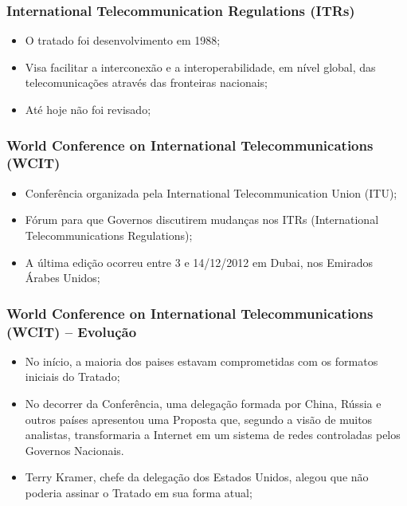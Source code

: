 \documentclass{beamer}
\begin{document}

\begin{frame}
\frametitle{International Telecommunication Regulations (ITRs)}
\begin{itemize}
\item O tratado foi desenvolvimento em 1988;
\item Visa facilitar a interconexão e a interoperabilidade, em nível global, das telecomunicações através das fronteiras nacionais;
\item Até hoje não foi revisado;
\end{itemize}
\end{frame}


\begin{frame}
\frametitle{World Conference on International Telecommunications (WCIT)}
\begin{itemize}
\item Conferência organizada pela International Telecommunication Union (ITU);
\item Fórum para que Governos discutirem mudanças nos ITRs (International Telecommunications Regulations); 
\item A última edição ocorreu entre 3 e 14/12/2012 em Dubai, nos Emirados Árabes Unidos;
\end{itemize}
\end{frame}


\begin{frame}
\frametitle{World Conference on International Telecommunications (WCIT) -- Evolução}
\begin{itemize}
\item No início, a maioria dos paises estavam comprometidas com os formatos iniciais do Tratado;
\item No decorrer da Conferência, uma delegação formada por China, Rússia e outros países apresentou uma Proposta que, segundo a visão de muitos analistas, transformaria a Internet em um sistema de redes controladas pelos Governos Nacionais.
\item Terry Kramer, chefe da delegação dos Estados Unidos, alegou que não poderia assinar o Tratado em sua forma atual;
\end{itemize}
\end{frame}

\end{document}
